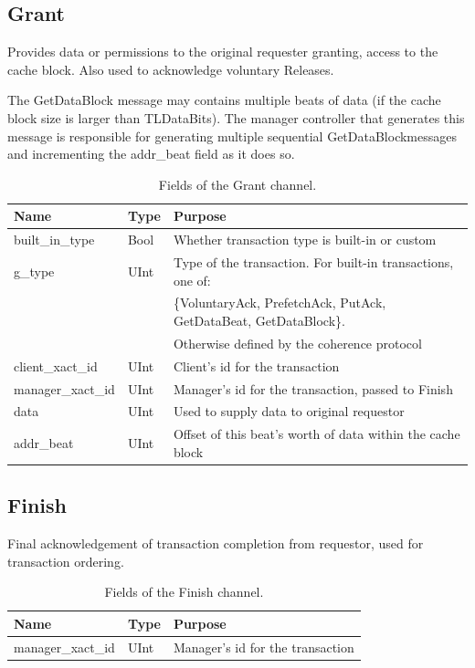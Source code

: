\subsection{Grant}

Provides data or permissions to the original requester granting, access to the cache block. Also used to acknowledge voluntary Releases.

The GetDataBlock message may contains multiple beats of data (if the cache block size is larger than TLDataBits).
The manager controller that generates this message is responsible for generating multiple sequential GetDataBlockmessages and incrementing the addr\_beat field as it does so.

\begin{table}[ht]
\begin{center}
\begin{tabular}{|l|l|l|}
    \hline
    Name & Type & Purpose \\ \hline \hline
built\_in\_type & Bool & Whether transaction type is built-in or custom \\ \hline
g\_type & UInt & Type of the transaction. For built-in transactions, one of: \\
        &      & \{VoluntaryAck, PrefetchAck, PutAck, GetDataBeat, GetDataBlock\}. \\
        &      & Otherwise defined by the coherence protocol \\ \hline
client\_xact\_id & UInt & Client's id for the transaction \\ \hline
manager\_xact\_id & UInt & Manager's id for the transaction, passed to Finish \\ \hline
data & UInt & Used to supply data to original requestor \\ \hline
addr\_beat & UInt & Offset of this beat's worth of data within the cache block \\ \hline
\end{tabular}
\end{center}
\caption{Fields of the Grant channel.}
\label{tab:grant}
\end{table}


\subsection{Finish}

Final acknowledgement of transaction completion from requestor, used for transaction ordering.

\begin{table}[ht]
\begin{center}
\begin{tabular}{|l|l|l|}
    \hline
    Name & Type & Purpose \\ \hline \hline
manager\_xact\_id & UInt & Manager's id for the transaction \\ \hline
\end{tabular}
\end{center}
\caption{Fields of the Finish channel.}
\label{tab:finish}
\end{table}

